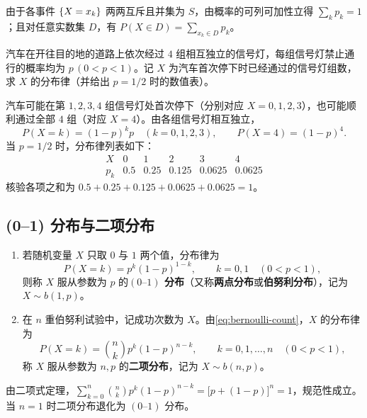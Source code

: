 由于各事件 $\{X=x_k\}$ 两两互斥且并集为 $S$，由概率的可列可加性立得 $\sum_k p_k=1$；且对任意实数集 $D$，有 $P(X\in D)=\sum_{x_k\in D}p_k$。

\begin{example}[title={通过信号灯组数的分布律}]
\label{eg:traffic-lights}
汽车在开往目的地的道路上依次经过 $4$ 组相互独立的信号灯，每组信号灯禁止通行的概率均为 $p\,(0<p<1)$。记 $X$ 为汽车首次停下时已经通过的信号灯组数，求 $X$ 的分布律（并给出 $p=1/2$ 时的数值表）。
\begin{solution}
汽车可能在第 $1,2,3,4$ 组信号灯处首次停下（分别对应 $X=0,1,2,3$），也可能顺利通过全部 $4$ 组（对应 $X=4$）。由各组信号灯相互独立，
\[
  P(X=k)=(1-p)^k p\quad(k=0,1,2,3),\qquad P(X=4)=(1-p)^4.
\]
当 $p=1/2$ 时，分布律列表如下：
\[
\begin{array}{c|ccccc}
  X & 0 & 1 & 2 & 3 & 4 \\ \hline
  p_k & 0.5 & 0.25 & 0.125 & 0.0625 & 0.0625
\end{array}
\]
核验各项之和为 $0.5+0.25+0.125+0.0625+0.0625=1$。
\end{solution}
\end{example}

\subsection{(0--1) 分布与二项分布}

\begin{definition}
\label{def:bernoulli-binomial}
\begin{enumerate}
  \item 若随机变量 $X$ 只取 $0$ 与 $1$ 两个值，分布律为
  \[
    P(X=k)=p^k(1-p)^{1-k},\qquad k=0,1\quad(0<p<1),
  \]
  则称 $X$ 服从参数为 $p$ 的\textbf{$(0\text{--}1)$ 分布}（又称\textbf{两点分布}或\textbf{伯努利分布}），记为 $X\sim b(1,p)$。
  \item 在 $n$ 重伯努利试验中，记成功次数为 $X$。由\eqref{eq:bernoulli-count}，$X$ 的分布律为
  \begin{equation}
    P(X=k)=\binom{n}{k}p^k(1-p)^{n-k},\qquad k=0,1,\ldots,n\quad(0<p<1),
    \label{eq:binomial-law}
  \end{equation}
  称 $X$ 服从参数为 $n,p$ 的\textbf{二项分布}，记为 $X\sim b(n,p)$。
\end{enumerate}
\end{definition}

由二项式定理，$\sum_{k=0}^{n}\binom{n}{k}p^k(1-p)^{n-k}=\bigl[p+(1-p)\bigr]^n=1$，规范性成立。当 $n=1$ 时二项分布退化为 $(0\text{--}1)$ 分布。

